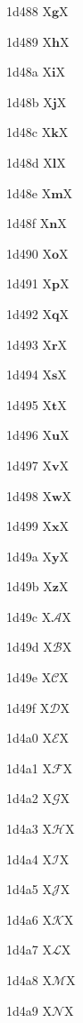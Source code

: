 \documentclass[11pt]{article}
\begin{document}
1d488 X{\ensuremath{\boldsymbol{g}}}X

1d489 X{\ensuremath{\boldsymbol{h}}}X

1d48a X{\ensuremath{\boldsymbol{i}}}X

1d48b X{\ensuremath{\boldsymbol{j}}}X

1d48c X{\ensuremath{\boldsymbol{k}}}X

1d48d X{\ensuremath{\boldsymbol{l}}}X

1d48e X{\ensuremath{\boldsymbol{m}}}X

1d48f X{\ensuremath{\boldsymbol{n}}}X

1d490 X{\ensuremath{\boldsymbol{o}}}X

1d491 X{\ensuremath{\boldsymbol{p}}}X

1d492 X{\ensuremath{\boldsymbol{q}}}X

1d493 X{\ensuremath{\boldsymbol{r}}}X

1d494 X{\ensuremath{\boldsymbol{s}}}X

1d495 X{\ensuremath{\boldsymbol{t}}}X

1d496 X{\ensuremath{\boldsymbol{u}}}X

1d497 X{\ensuremath{\boldsymbol{v}}}X

1d498 X{\ensuremath{\boldsymbol{w}}}X

1d499 X{\ensuremath{\boldsymbol{x}}}X

1d49a X{\ensuremath{\boldsymbol{y}}}X

1d49b X{\ensuremath{\boldsymbol{z}}}X

1d49c X{\ensuremath{\mathscr{A}}}X

1d49d X{\ensuremath{\mathscr{B}}}X

1d49e X{\ensuremath{\mathscr{C}}}X

1d49f X{\ensuremath{\mathscr{D}}}X

1d4a0 X{\ensuremath{\mathscr{E}}}X

1d4a1 X{\ensuremath{\mathscr{F}}}X

1d4a2 X{\ensuremath{\mathscr{G}}}X

1d4a3 X{\ensuremath{\mathscr{H}}}X

1d4a4 X{\ensuremath{\mathscr{I}}}X

1d4a5 X{\ensuremath{\mathscr{J}}}X

1d4a6 X{\ensuremath{\mathscr{K}}}X

1d4a7 X{\ensuremath{\mathscr{L}}}X

1d4a8 X{\ensuremath{\mathscr{M}}}X

1d4a9 X{\ensuremath{\mathscr{N}}}X
\end{document}
